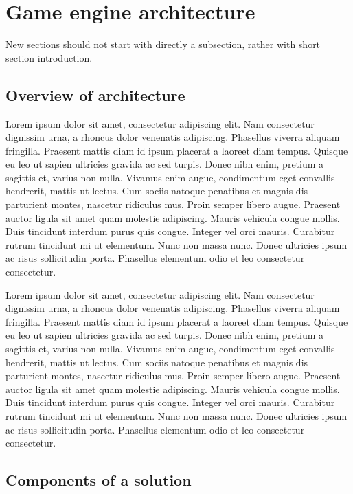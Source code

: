 \section{Game engine architecture}
New sections should not start with directly a subsection, rather with short section introduction. 

\subsection{Overview of architecture}
Lorem ipsum dolor sit amet, consectetur adipiscing elit. Nam consectetur dignissim urna, a rhoncus dolor venenatis adipiscing. Phasellus viverra aliquam fringilla. Praesent mattis diam id ipsum placerat a laoreet diam tempus. Quisque eu leo ut sapien ultricies gravida ac sed turpis. Donec nibh enim, pretium a sagittis et, varius non nulla. Vivamus enim augue, condimentum eget convallis hendrerit, mattis ut lectus. Cum sociis natoque penatibus et magnis dis parturient montes, nascetur ridiculus mus. Proin semper libero augue. Praesent auctor ligula sit amet quam molestie adipiscing. Mauris vehicula congue mollis. Duis tincidunt interdum purus quis congue. Integer vel orci mauris. Curabitur rutrum tincidunt mi ut elementum. Nunc non massa nunc. Donec ultricies ipsum ac risus sollicitudin porta. Phasellus elementum odio et leo consectetur consectetur. 

Lorem ipsum dolor sit amet, consectetur adipiscing elit. Nam consectetur dignissim urna, a rhoncus dolor venenatis adipiscing. Phasellus viverra aliquam fringilla. Praesent mattis diam id ipsum placerat a laoreet diam tempus. Quisque eu leo ut sapien ultricies gravida ac sed turpis. Donec nibh enim, pretium a sagittis et, varius non nulla. Vivamus enim augue, condimentum eget convallis hendrerit, mattis ut lectus. Cum sociis natoque penatibus et magnis dis parturient montes, nascetur ridiculus mus. Proin semper libero augue. Praesent auctor ligula sit amet quam molestie adipiscing. Mauris vehicula congue mollis. Duis tincidunt interdum purus quis congue. Integer vel orci mauris. Curabitur rutrum tincidunt mi ut elementum. Nunc non massa nunc. Donec ultricies ipsum ac risus sollicitudin porta. Phasellus elementum odio et leo consectetur consectetur. 

\subsection{Components of a solution}

